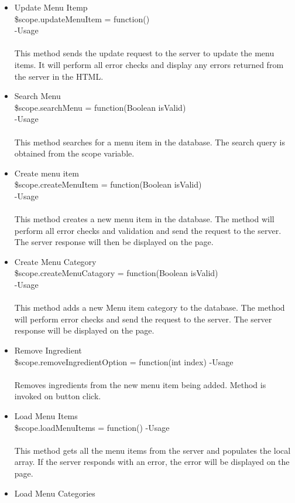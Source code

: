 \documentclass[a4paper,12pt]{article}
\begin{document}
\begin{enumerate}
\begin{itemize}
		\item Update Menu Itemp\\
		\$scope.updateMenuItem = function()\\
		-Usage\\ \\
		This method sends the update request to the server to update the menu items. It will perform all error checks and display any errors returned from the server in the HTML.
		\item Search Menu\\
		\$scope.searchMenu = function(Boolean isValid)\\
		-Usage\\ \\
		This method searches for a menu item in the database. The search query is obtained from the scope variable.
		\item Create menu item\\
		\$scope.createMenuItem = function(Boolean isValid)\\
		-Usage\\ \\
		This method creates a new menu item in the database. The method will perform all error checks and validation and send the request to the server. The server response will then be displayed on the page.
		\item Create Menu Category\\
		\$scope.createMenuCatagory = function(Boolean isValid)\\
		-Usage\\ \\
		This method adds a new Menu item category to the database. The method will perform error checks and send the request to the server. The server response will be displayed on the page.
		\item Remove Ingredient\\
		\$scope.removeIngredientOption = function(int index)
		-Usage\\ \\
		Removes ingredients from the  new menu item being added. Method is invoked on button click.
		\item Load Menu Items\\
		\$scope.loadMenuItems = function()
		-Usage\\ \\
		This method gets all the menu items from the server and populates the local array. If the server responds with an error, the error will be displayed on the page.
		\item Load Menu Categories\\

\end{itemize}
\end{enumerate}
\end{document}
